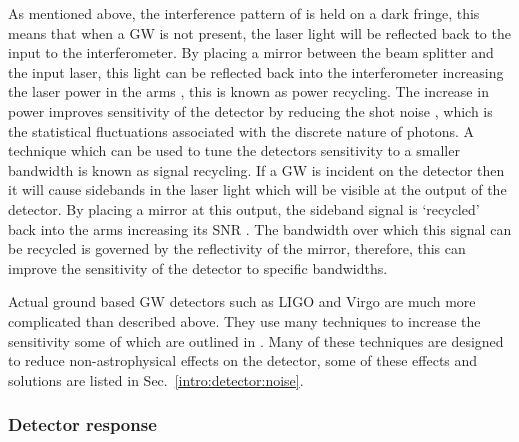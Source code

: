 As mentioned above, the interference pattern of is held on a dark fringe, this means that when a \gls{GW} is not present, the laser light will be reflected back to the input to the interferometer.
By placing a mirror between the beam splitter and the input laser, this light can be reflected back into the interferometer increasing the laser power in the arms \citep{pitkin2011GravitationalWave}, this is known as power recycling. The increase in power improves sensitivity of the detector by reducing the shot noise \citep{abbott2009LIGOLaser}, which is the statistical fluctuations associated with the discrete nature of photons. 
A technique which can be used to tune the detectors sensitivity to a smaller bandwidth is known as signal recycling. 
If a \gls{GW} is incident on the detector then it will cause sidebands in the laser light which will be visible at the output of the detector. By placing a mirror at this output, the sideband signal is `recycled' back into the arms increasing its \gls{SNR} \citep{pitkin2011GravitationalWave}. The bandwidth over which this signal can be recycled is governed by the reflectivity of the mirror, therefore, this can improve the sensitivity of the detector to specific bandwidths. 

Actual ground based \gls{GW} detectors such as \gls{LIGO} \citep{abbott2009LIGOLaser} and
Virgo \citep{acernese2015AdvancedVirgo} are much more complicated than
described above.  They use many techniques to increase the sensitivity some of
which are outlined in \citep{aasi2015AdvancedLIGO,abbott2009LIGOLaser}.  Many of these techniques are
designed to reduce non-astrophysical effects on the detector,
some of these effects and solutions are listed in
Sec.~\ref{intro:detector:noise}.

\subsubsection{\label{intro:detector:response}Detector response}

